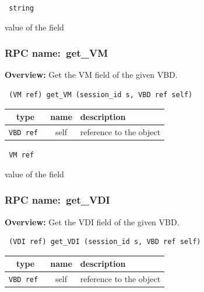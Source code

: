 \vspace{0.3cm}

{\tt 
string
}


value of the field
\vspace{0.3cm}
\vspace{0.3cm}
\vspace{0.3cm}
\subsubsection{RPC name:~get\_VM}

{\bf Overview:} 
Get the VM field of the given VBD.

\begin{verbatim} (VM ref) get_VM (session_id s, VBD ref self)\end{verbatim}



 
\vspace{0.3cm}
\begin{tabular}{|c|c|p{7cm}|}
 \hline
{\bf type} & {\bf name} & {\bf description} \\ \hline
{\tt VBD ref } & self & reference to the object \\ \hline 

\end{tabular}

\vspace{0.3cm}

{\tt 
VM ref
}


value of the field
\vspace{0.3cm}
\vspace{0.3cm}
\vspace{0.3cm}
\subsubsection{RPC name:~get\_VDI}

{\bf Overview:} 
Get the VDI field of the given VBD.

\begin{verbatim} (VDI ref) get_VDI (session_id s, VBD ref self)\end{verbatim}



 
\vspace{0.3cm}
\begin{tabular}{|c|c|p{7cm}|}
 \hline
{\bf type} & {\bf name} & {\bf description} \\ \hline
{\tt VBD ref } & self & reference to the object \\ \hline 

\end{tabular}

